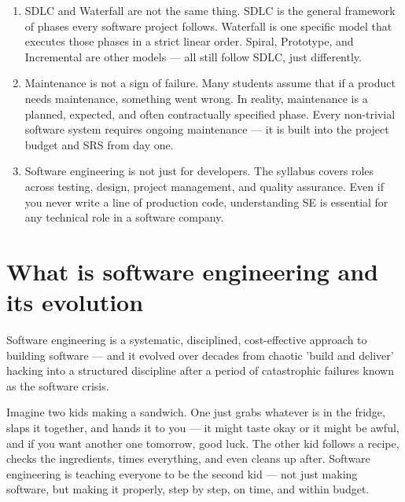 \documentclass{report}
\begin{document}
\begin{miss}
\begin{enumerate}
\item SDLC and Waterfall are not the same thing. SDLC is the general framework of phases every software project follows. Waterfall is one specific model that executes those phases in a strict linear order. Spiral, Prototype, and Incremental are other models — all still follow SDLC, just differently.
\item Maintenance is not a sign of failure. Many students assume that if a product needs maintenance, something went wrong. In reality, maintenance is a planned, expected, and often contractually specified phase. Every non-trivial software system requires ongoing maintenance — it is built into the project budget and SRS from day one.
\item Software engineering is not just for developers. The syllabus covers roles across testing, design, project management, and quality assurance. Even if you never write a line of production code, understanding SE is essential for any technical role in a software company.
\end{enumerate}
\end{miss}

\section{What is software engineering and its evolution}
Software engineering is a systematic, disciplined, cost-effective approach to building software — and it evolved over decades from chaotic 'build and deliver' hacking into a structured discipline after a period of catastrophic failures known as the software crisis.

\begin{eli5}
	Imagine two kids making a sandwich. One just grabs whatever is in the fridge, slaps it together, and hands it to you — it might taste okay or it might be awful, and if you want another one tomorrow, good luck. The other kid follows a recipe, checks the ingredients, times everything, and even cleans up after. Software engineering is teaching everyone to be the second kid — not just making software, but making it properly, step by step, on time, and within budget.
\end{eli5}

\end{document}
